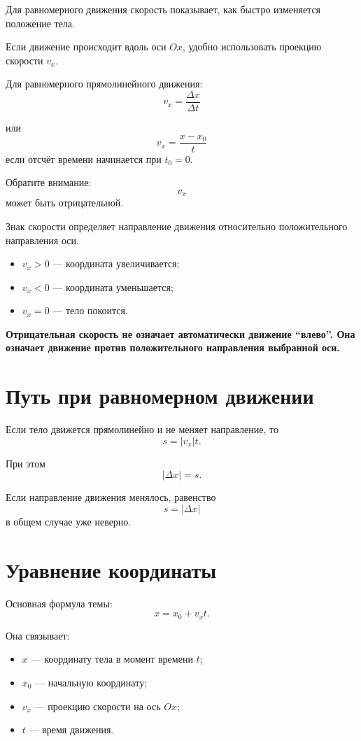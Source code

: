 \documentclass[a4paper,12pt]{article}
\newcommand{\important}[1]{\textbf{#1}}
\begin{document}
Для равномерного движения скорость показывает, как быстро изменяется положение тела.

Если движение происходит вдоль оси \(Ox\), удобно использовать проекцию скорости \(v_x\).

Для равномерного прямолинейного движения:
\[
\boxed{v_x=\frac{\Delta x}{\Delta t}}
\]

или
\[
\boxed{v_x=\frac{x-x_0}{t}}
\]
если отсчёт времени начинается при \(t_0=0\).

Обратите внимание:
\[
v_x
\]
может быть отрицательной.

Знак скорости определяет направление движения относительно положительного направления оси.

\begin{itemize}
  \item \(v_x>0\) --- координата увеличивается;
  \item \(v_x<0\) --- координата уменьшается;
  \item \(v_x=0\) --- тело покоится.
\end{itemize}

\important{Отрицательная скорость не означает автоматически движение ``влево''. Она означает движение против положительного направления выбранной оси.}

\section{Путь при равномерном движении}

Если тело движется прямолинейно и не меняет направление, то
\[
s=|v_x|t.
\]

При этом
\[
|\Delta x|=s.
\]

Если направление движения менялось, равенство
\[
s=|\Delta x|
\]
в общем случае уже неверно.

\section{Уравнение координаты}

Основная формула темы:
\[
\boxed{x=x_0+v_xt}.
\]

Она связывает:

\begin{itemize}
  \item \(x\) --- координату тела в момент времени \(t\);
  \item \(x_0\) --- начальную координату;
  \item \(v_x\) --- проекцию скорости на ось \(Ox\);
  \item \(t\) --- время движения.
\end{itemize}
\end{document}

